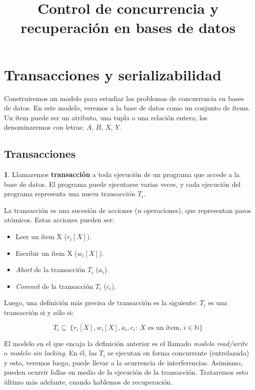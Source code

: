 \documentclass[english]{article}
\theoremstyle{definition}
\theoremstyle{definition}
\newtheorem*{defn*}{\protect\definitionname}
\providecommand{\definitionname}{Definición}
\begin{document}
\title{Control de concurrencia y recuperación en bases de datos}


\section{Transacciones y serializabilidad}

Construiremos un modelo para estudiar los problemas de concurrencia en bases
de datos. En este modelo, veremos a la base de datos como un conjunto de
ítems. Un ítem puede ser un atributo, una tupla o una relación entera; los
denominaremos con letras: $A$, $B$, $X$, $Y$.

\subsection{Transacciones}

\begin{defn*}
Llamaremos \textbf{transacción} a toda ejecución de un programa que accede a
la base de datos. El programa puede ejecutarse varias veces, y cada ejecución
del programa representa una nueva transacción $T_i$.

La transacción es una sucesión de acciones (u operaciones), que representan
pasos atómicos. Estas acciones pueden ser:

\begin{itemize}
    \item Leer un ítem X ($r_i[X]$).
    \item Escribir un ítem X ($w_i[X]$).
    \item \emph{Abort} de la transacción $T_i$ ($a_i$).
    \item \emph{Commit} de la transacción $T_i$ ($c_i$).
\end{itemize}

Luego, una definición más precisa de transacción es la siguiente: $T_i$ es una
transacción si y sólo si:

$$T_i \subseteq \
    \{r_i[X], w_i[X], a_i, c_i: \
        X \mbox{ es un ítem, } i \in \mathbb{N}\}$$
\end{defn*}

El modelo en el que encaja la definición anterior es el llamado \emph{modelo
read/write} o \emph{modelo sin locking}. En él, las $T_i$ se ejecutan en forma
concurrente (entrelazada) y esto, veremos luego, puede llevar a la ocurrencia
de interferencias. Asimismo, pueden ocurrir fallas en medio de la ejecución de
la transacción. Trataremos esto último más adelante, cuando hablemos de
recuperación.
\end{document}
